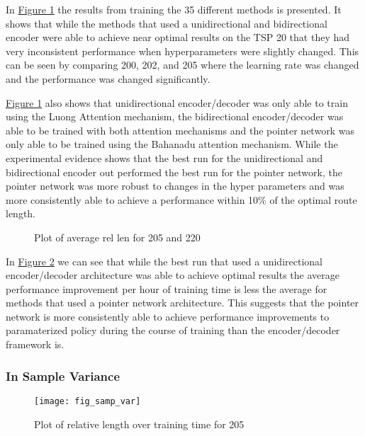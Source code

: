 \documentclass[12pt]{article}
\begin{document}
In \hyperref[fig_sl_table]{Figure 1} the results from training the 35 different methods is presented. It shows that while the methods that used a unidirectional and bidirectional encoder were able to achieve near optimal results on the TSP 20 that they had very inconsistent performance when hyperparameters were slightly changed. This can be seen by comparing 200, 202, and 205 where the learning rate was changed and the performance was changed significantly.

\hyperref[fig_sl_table]{Figure 1} also shows that unidirectional encoder/decoder was only able to train using the Luong Attention mechanism, the bidirectional encoder/decoder was able to be trained with both attention mechanisms and the pointer network was only able to be trained using the Bahanadu attention mechanism. While the experimental evidence shows that the best run for the unidirectional and bidirectional encoder out performed the best run for the pointer network, the pointer network was more robust to changes in the hyper parameters and was more consistently able to achieve a performance within 10\% of the optimal route length.

\begin{figure}[H]
  \centering
  \caption{Plot of average rel len for 205 and 220}
  \label{fig_sr_trainrate}
\end{figure}

In \hyperref[fig_sr_trainrate]{Figure 2} we can see that while the best run that used a unidirectional encoder/decoder architecture was able to achieve optimal results the average performance improvement per hour of training time is less the average for methods that used a pointer network architecture. This suggests that the pointer network is more consistently able to achieve performance improvements to paramaterized policy during the course of training than the encoder/decoder framework is.

\subsubsection{In Sample Variance}
\begin{figure}[H]
  \centering
  \texttt{[image: fig\_samp\_var]}
  \caption{Plot of relative length over training time for 205}
  \label{fig_samp_var}
\end{figure}
\end{document}
